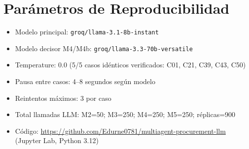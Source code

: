 \documentclass[preprint,12pt,authoryear]{elsarticle}
\begin{document}
\section{Par\'ametros de Reproducibilidad}
\label{app:repro}

\begin{itemize}
  \item Modelo principal: \texttt{groq/llama-3.1-8b-instant}
  \item Modelo decisor M4/M4b: \texttt{groq/llama-3.3-70b-versatile}
  \item Temperature: 0.0 (5/5 casos id\'enticos verificados: C01, C21, C39,
        C43, C50)
  \item Pausa entre casos: 4--8 segundos seg\'un modelo
  \item Reintentos m\'aximos: 3 por caso
  \item Total llamadas LLM: M2=50; M3=250; M4=250; M5=250; r\'eplicas=900
  \item C\'odigo: \url{https://github.com/Edurne0781/multiagent-procurement-llm}
        (Jupyter Lab, Python 3.12)
\end{itemize}
\end{document}
